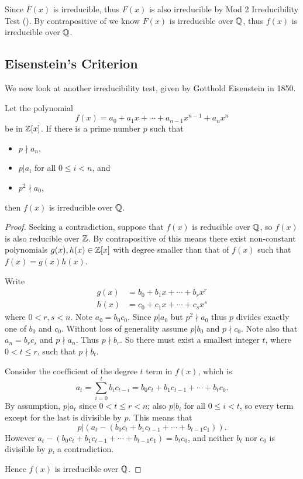 \begin{example}
    Since $\bar{F}(x)$ is irreducible, thus $F(x)$ is also irreducible by Mod 2 Irreducibility Test (). By contrapositive of  we know $F(x)$ is irreducible over $\mathbb{Q}$, thus $f(x)$ is irreducible over $\mathbb{Q}$.
\end{example}

\subsection{Eisenstein's Criterion}
We now look at another irreducibility test, given by Gotthold Eisenstein in 1850.

\begin{theorem}\label{thrm-eisenstein-criterion}
    Let the polynomial
    \[
        f(x) = a_0 + a_1x + \cdots + a_{n-1}x^{n-1} + a_nx^n
    \]
    be in $\mathbb{Z}[x]$. If there is a prime number $p$ such that
    \begin{itemize}
        \item $p \nmid a_n$,
        \item $p \vert a_i$ for all $0 \leq i < n$, and
        \item $p^2 \nmid a_0$,
    \end{itemize}
    then $f(x)$ is irreducible over $\mathbb{Q}$.
\end{theorem}
\begin{proof}
    Seeking a contradiction, suppose that $f(x)$ is reducible over $\mathbb{Q}$, so $f(x)$ is also reducible over $\mathbb{Z}$. By contrapositive of  this means there exist non-constant polynomials $g(x),h(x) \in \mathbb{Z}[x]$ with degree smaller than that of $f(x)$ such that $f(x) = g(x)h(x)$.

    Write
    \begin{align*}
        g(x) &= b_0 + b_1x + \cdots + b_rx^r\\
        h(x) &= c_0 + c_1x + \cdots + c_sx^s
    \end{align*}
    where $0 < r, s < n$. Note $a_0 = b_0c_0$. Since $p \vert a_0$ but $p^2 \nmid a_0$ thus $p$ divides exactly one of $b_0$ and $c_0$. Without loss of generality assume $p \vert b_0$ and $p \nmid c_0$. Note also that $a_n = b_rc_s$ and $p \nmid a_n$. Thus $p \nmid b_r$. So there must exist a smallest integer $t$, where $0 < t \leq r$, such that $p \nmid b_t$.

    Consider the coefficient of the degree $t$ term in $f(x)$, which is
    \[
        a_t = \sum_{i=0}^tb_ic_{t-i} = b_0c_t + b_1c_{t-1} + \cdots + b_tc_0.
    \]
    By assumption, $p \vert a_t$ since $0 < t \leq r < n$; also $p \vert b_i$ for all $0 \leq i < t$, so every term except for the last is divisible by $p$. This means that
    \[
        p \vert (a_t - (b_0c_t + b_1c_{t-1} + \cdots + b_{t-1}c_1)).
    \]
    However $a_t - (b_0c_t + b_1c_{t-1} + \cdots + b_{t-1}c_1) = b_tc_0$, and neither $b_t$ nor $c_0$ is divisible by $p$, a contradiction.

    Hence $f(x)$ is irreducible over $\mathbb{Q}$.
\end{proof}

